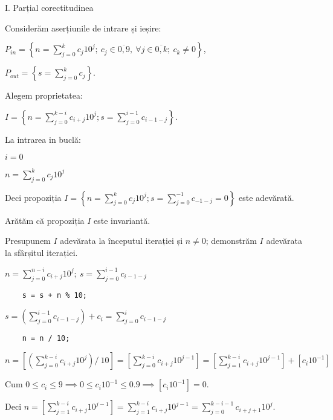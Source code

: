 \documentclass[11pt]{article}
\begin{document}
I. Parțial corectitudinea
\newline

Considerăm aserțiunile de intrare și ieșire:

$P_{in} = \left\{ n = \sum\limits_{j=0}^{k} c_{j}10^{j};\ 
                c_{j} \in \overline{0,9} ,\ \forall j \in \overline{0,k};\ 
                c_{k} \neq 0 \right\}$,

$P_{out} = \left\{ s = \sum\limits_{j=0}^{k} c_{j} \right\}$.

\vspace{14pt}
Alegem proprietatea:

$I = \left\{
              n = \sum\limits_{j=0}^{k-i}c_{i+j}10^{j};
              s = \sum\limits_{j=0}^{i-1}c_{i-1-j}
 \right\}$.

\vspace{14pt}
La intrarea in buclă:

$i = 0$

$n = \sum\limits_{j=0}^{k}c_{j}10^{j}$

Deci propoziția
$I = \left\{
              n = \sum\limits_{j=0}^{k}c_{j}10^{j};
              s = \sum\limits_{j=0}^{-1}c_{-1-j} = 0
      \right\}$ 
 este adevărată.

Arătăm că propoziția $I$ este invariantă.

Presupunem $I$ adevărata la începutul iterației și $n \ne 0$; demonstrăm $I$ adevărata la sfârșitul iterației.

$n = \sum\limits_{j=0}^{n-i}c_{i+j}10^{j};\ 
s = \sum\limits_{j=0}^{i-1}c_{i-1-j}
$
\begin{verbatim}
    s = s + n % 10;
\end{verbatim}

$s = \left( \sum\limits_{j=0}^{i-1}c_{i-1-j} \right) + c_{i}
= \sum\limits_{j=0}^{i}c_{i-1-j}
$

\begin{verbatim}
    n = n / 10;
\end{verbatim}

$n = \left[ \left( \sum\limits_{j=0}^{k-i}c_{i+j}10^{j} \right) / \ 10 \right]
= \left[ \sum\limits_{j=0}^{k-i}c_{i+j}10^{j-1} \right]
= \left[ \sum\limits_{j=1}^{k-i}c_{i+j}10^{j-1} \right] + \left[c_{i}10^{-1} \right]
$

Cum $0 \le c_{i} \le 9 \implies 0 \le c_{i}10^{-1} \le 0.9 \implies \left[c_{i}10^{-1} \right] = 0$.

Deci $n = \left[ \sum\limits_{j=1}^{k-i}c_{i+j}10^{j-1} \right] = \sum\limits_{j=1}^{k-i}c_{i+j}10^{j-1} = \sum\limits_{j=0}^{k-i-1}c_{i+j+1}10^{j}$. 
\end{document}
